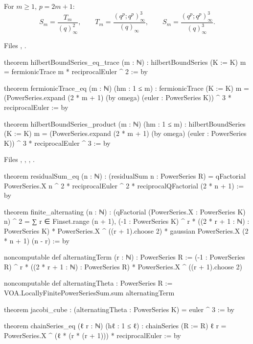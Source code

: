 \begin{theorem}\label{l20:thm:qseries}
For $m\ge1$, $p=2m+1$:
\begin{equation*}
S_m=\frac{T_m}{(q)^2_\infty},\qquad T_m=\frac{(q^p;q^p)_\infty^3}{(q)_\infty},\qquad
S_m=\frac{(q^p;q^p)^3_\infty}{(q)^3_\infty}.
\end{equation*}
\end{theorem}
\noindent Files ,
.
\begin{leancode}
theorem hilbertBoundSeries_eq_trace (m : ℕ) :
    hilbertBoundSeries (K := K) m = fermionicTrace m * reciprocalEuler ^ 2 := by

theorem fermionicTrace_eq (m : ℕ) (hm : 1 ≤ m) :
    fermionicTrace (K := K) m =
      (PowerSeries.expand (2 * m + 1) (by omega) (euler : PowerSeries K)) ^ 3 *
        reciprocalEuler := by

theorem hilbertBoundSeries_product (m : ℕ) (hm : 1 ≤ m) :
    hilbertBoundSeries (K := K) m =
      (PowerSeries.expand (2 * m + 1) (by omega) (euler : PowerSeries K)) ^ 3 *
        reciprocalEuler ^ 3 := by
\end{leancode}
\noindent Files ,
,
,
.
\begin{leancode}
theorem residualSum_eq (n : ℕ) :
    (residualSum n : PowerSeries R) =
      qFactorial PowerSeries.X n ^ 2 * reciprocalEuler ^ 2 *
        reciprocalQFactorial (2 * n + 1) := by

theorem finite_alternating (n : ℕ) :
    (qFactorial (PowerSeries.X : PowerSeries K) n) ^ 2 =
      ∑ r ∈ Finset.range (n + 1),
        (-1 : PowerSeries K) ^ r * ((2 * r + 1 : ℕ) : PowerSeries K) *
          PowerSeries.X ^ ((r + 1).choose 2) *
            gaussian PowerSeries.X (2 * n + 1) (n - r) := by

noncomputable def alternatingTerm (r : ℕ) : PowerSeries R :=
  (-1 : PowerSeries R) ^ r * ((2 * r + 1 : ℕ) : PowerSeries R) *
    PowerSeries.X ^ ((r + 1).choose 2)

noncomputable def alternatingTheta : PowerSeries R :=
  VOA.LocallyFinitePowerSeriesSum.sum alternatingTerm

theorem jacobi_cube : (alternatingTheta : PowerSeries K) = euler ^ 3 := by

theorem chainSeries_eq (ℓ r : ℕ) (hℓ : 1 ≤ ℓ) :
    chainSeries (R := R) ℓ r =
      PowerSeries.X ^ (ℓ * (r * (r + 1))) * reciprocalEuler := by
\end{leancode}

